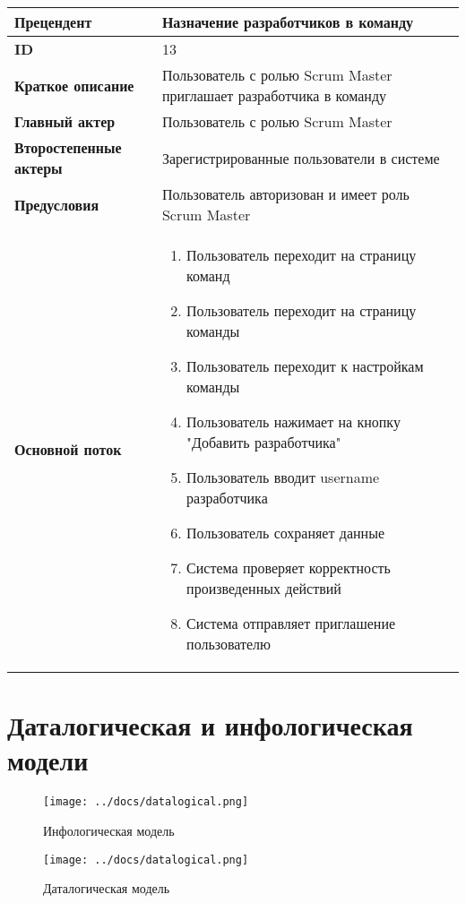 \documentclass[14pt,a4paper]{extarticle}
\begin{document}
\begin{tabular}{|l|p{9cm}|}
	\hline
	\textbf{Прецендент}            & Назначение разработчиков в команду                                  \\
	\hline
	\textbf{ID}                    & 13                                                                  \\
	\hline
	\textbf{Краткое описание}      & Пользователь с ролью Scrum Master приглашает разработчика в команду \\
	\hline
	\textbf{Главный актер}         & Пользователь с ролью Scrum Master                                   \\
	\hline
	\textbf{Второстепенные актеры} & Зарегистрированные пользователи в системе                           \\
	\hline
	\textbf{Предусловия}           & Пользователь авторизован и имеет роль Scrum Master                  \\
	\hline
	\textbf{Основной поток}        & \begin{enumerate}
		                                 \item Пользователь переходит на страницу команд
		                                 \item Пользователь переходит на страницу команды
		                                 \item Пользователь переходит к настройкам команды
		                                 \item Пользователь нажимает на кнопку "Добавить разработчика"
		                                 \item Пользователь вводит username разработчика
		                                 \item Пользователь сохраняет данные
		                                 \item Система проверяет корректность произведенных действий
		                                 \item Система отправляет приглашение пользователю
	                                 \end{enumerate}        \\
	\hline
\end{tabular}

\section{Даталогическая и инфологическая модели}

\begin{figure}[ht]
  \centering
  \texttt{[image: ../docs/datalogical.png]}
  \caption{Инфологическая модель}
\end{figure}


\clearpage
\begin{figure}[ht]
  \centering
  \texttt{[image: ../docs/datalogical.png]}
  \caption{Даталогическая модель}
\end{figure}

\printnoidxglossaries
\end{document}
